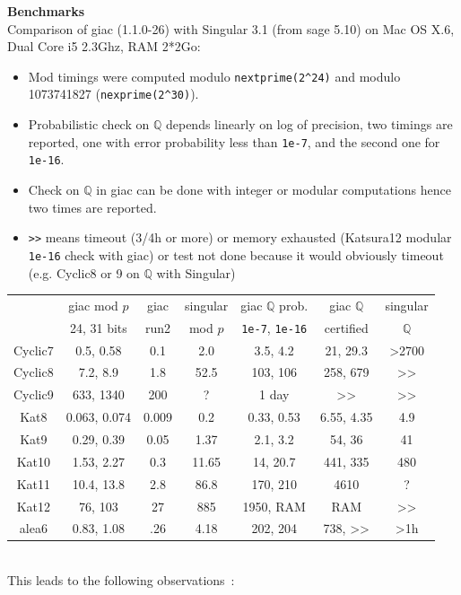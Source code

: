 \documentclass[a4paper,11pt]{article}
\newcommand{\Q}{{\mathbb{Q}}}
\begin{document}
{\bf Benchmarks}\\
Comparison of giac (1.1.0-26) with Singular 3.1 (from sage 5.10) 
on Mac OS X.6, Dual Core i5 2.3Ghz, RAM 2*2Go:
\begin{itemize}
\item Mod timings were computed modulo \verb|nextprime(2^24)|
and modulo 1073741827 (\verb|nexprime(2^30)|).
\item Probabilistic check on $\Q$ depends linearly on log of precision, two
timings are reported, one with error probability less than \verb|1e-7|, and
the second one for \verb|1e-16|.
\item Check on $\Q$ in giac can be done with integer or modular computations
hence two times are reported.
\item \verb|>>| means timeout (3/4h or more) or memory exhausted
(Katsura12 modular \verb|1e-16| check with giac) or test not done because
it would obviously timeout (e.g. Cyclic8 or 9 on $\Q$ with Singular)
\end{itemize}
\begin{tabular}{|c|c|c|c||c|c|c|} \hline
        & giac mod $p$ & giac & singular & giac $\Q$ prob. & giac $\Q$  & singular \\ 
        & 24, 31 bits & run2 & mod $p$ & \verb|1e-7|, \verb|1e-16| & certified & $\Q$ \\ \hline
Cyclic7 & 0.5, 0.58 & 0.1&2.0 & 3.5, 4.2 & 21, 29.3 & >2700 \\
Cyclic8 & 7.2, 8.9 & 1.8 &52.5 & 103, 106 & 258, 679 & >> \\
Cyclic9 & 633, 1340 & 200 & ? & 1 day & >> & >> \\ \hline
Kat8 & 0.063, 0.074 & 0.009& 0.2 & 0.33, 0.53 & 6.55, 4.35 & 4.9\\
Kat9 & 0.29, 0.39 & 0.05 &1.37 & 2.1, 3.2 & 54, 36& 41\\
Kat10 & 1.53, 2.27 & 0.3& 11.65 & 14, 20.7 & 441, 335 &  480 \\
Kat11 & 10.4, 13.8 & 2.8 & 86.8 & 170, 210& 4610 & ? \\
Kat12 & 76, 103 & 27 & 885 & 1950, RAM & RAM & >> \\ \hline
alea6 & 0.83, 1.08& .26 & 4.18 & 202, 204& 738, >> & >1h\\
\hline 
\end{tabular}\\
This leads to the following observations~:
\end{document}
